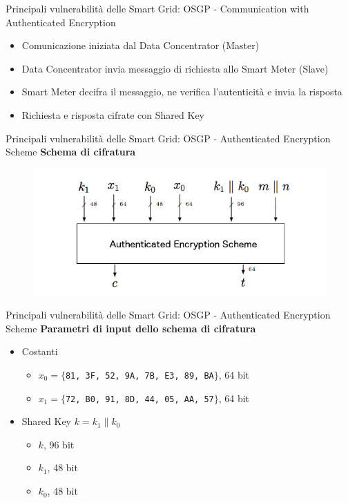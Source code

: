 \begin{frame}{Principali vulnerabilità delle Smart Grid: OSGP - Communication with Authenticated Encryption}
	\begin{itemize}[<+- | alert@+>]
		\item Comunicazione iniziata dal Data Concentrator (Master)
		\item Data Concentrator invia messaggio di richiesta allo Smart Meter (Slave)
		\item Smart Meter decifra il messaggio, ne verifica l'autenticità e invia la risposta
		\item Richiesta e risposta cifrate con Shared Key
	\end{itemize}
\end{frame}

\begin{frame}{Principali vulnerabilità delle Smart Grid: OSGP - Authenticated Encryption Scheme}
	\textbf{Schema di cifratura}
	\begin{figure}[h] 
		\includegraphics[scale=0.4,cfbox=blue_slides 1pt 0pt]{imgs/c_scheme.png}
	\end{figure}
\end{frame}

\begin{frame}{Principali vulnerabilità delle Smart Grid: OSGP - Authenticated Encryption Scheme}
	\textbf{Parametri di input dello schema di cifratura}
	\begin{itemize}
		\item Costanti
		\begin{itemize}
			\item $x_0 = \{${\tt 81, 3F, 52, 9A, 7B, E3, 89, BA}$\}$, 64 bit
			\item $x_1 = \{${\tt 72, B0, 91, 8D, 44, 05, AA, 57}$\}$, 64 bit
		\end{itemize}
		\pause
		\item Shared Key $k = k_1 \| k_0$
		\begin{itemize}
			\item $k$, 96 bit
			\item $k_1$, 48 bit
			\item $k_0$, 48 bit
		\end{itemize}
	\end{itemize}
\end{frame}

